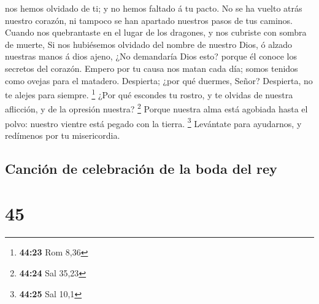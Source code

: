 nos hemos olvidado de ti; y no hemos faltado á tu pacto. 
No se ha vuelto atrás nuestro corazón, ni tampoco se han apartado
nuestros pasos de tus caminos.  Cuando nos quebrantaste en
el lugar de los dragones, y nos cubriste con sombra de muerte,
 Si nos hubiésemos olvidado del nombre de nuestro Dios, ó
alzado nuestras manos á dios ajeno,  ¿No demandaría Dios
esto? porque él conoce los secretos del corazón.  Empero
por tu causa nos matan cada día; somos tenidos como ovejas para el
matadero.  Despierta; ¿por qué duermes, Señor? Despierta,
no te alejes para siempre. \footnote{\textbf{44:23} Rom 8,36}
 ¿Por qué escondes tu rostro, y te olvidas de nuestra
aflicción, y de la opresión nuestra? \footnote{\textbf{44:24} Sal 35,23}
 Porque nuestra alma está agobiada hasta el polvo: nuestro
vientre está pegado con la tierra. \footnote{\textbf{44:25} Sal 10,1}
 Levántate para ayudarnos, y redímenos por tu misericordia.

\hypertarget{canciuxf3n-de-celebraciuxf3n-de-la-boda-del-rey}{%
\subsection{Canción de celebración de la boda del
rey}\label{canciuxf3n-de-celebraciuxf3n-de-la-boda-del-rey}}

\hypertarget{section-44}{%
\section{45}\label{section-44}}

